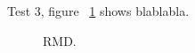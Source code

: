 Test 3, figure ~\ref{fig:valid_RMDYB0} shows blablabla.
\begin{figure}[h!]
  \centering
  \label{fig:valid_RMDYB0}
  \caption{RMD. }
\end{figure}
 

